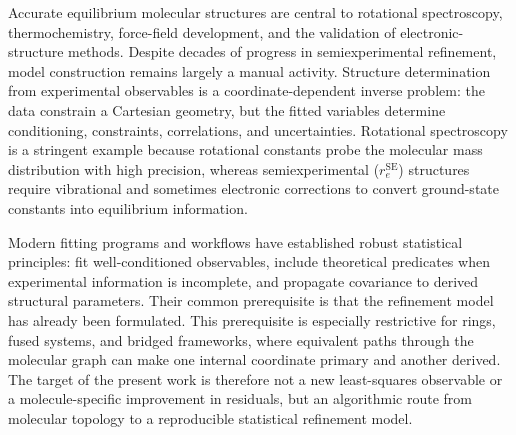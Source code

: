 \documentclass[aip,jcp,reprint,longbibliography,floatfix]{revtex4-2}
\begin{document}
Accurate equilibrium molecular structures are central to rotational
spectroscopy, thermochemistry, force-field development, and the validation of
electronic-structure methods.\cite{Demaison2011EquilibriumStructures,PuzzariniStanton2023}
Despite decades of progress in semiexperimental refinement, model construction
remains largely a manual activity. Structure determination from experimental
observables is a coordinate-dependent inverse problem: the data constrain a
Cartesian geometry, but the fitted variables determine conditioning,
constraints, correlations, and uncertainties. Rotational spectroscopy is a
stringent example because rotational constants probe the molecular mass
distribution with high precision, whereas semiexperimental
($r_e^{\mathrm{SE}}$) structures require vibrational and sometimes electronic
corrections to convert ground-state constants into equilibrium
information.\cite{Costain1958,Pawlowski2002,Piccardo2015B3LYP,Penocchio2015B2PLYP}

Modern fitting programs and workflows\cite{Mendolicchio2017MSR,KisielPROSPE,Kanzow2025PCCP}
have established robust statistical principles: fit well-conditioned
observables, include theoretical predicates when experimental information is
incomplete, and propagate covariance to derived structural
parameters.\cite{Bartell1975Predicate} Their common prerequisite is that the
refinement model has already been formulated. This prerequisite is especially
restrictive for rings, fused systems, and bridged frameworks, where equivalent
paths through the molecular graph can make one internal coordinate primary and
another derived. The target of the present work is therefore not a new
least-squares observable or a molecule-specific improvement in residuals, but
an algorithmic route from molecular topology to a reproducible statistical
refinement model.
\end{document}
